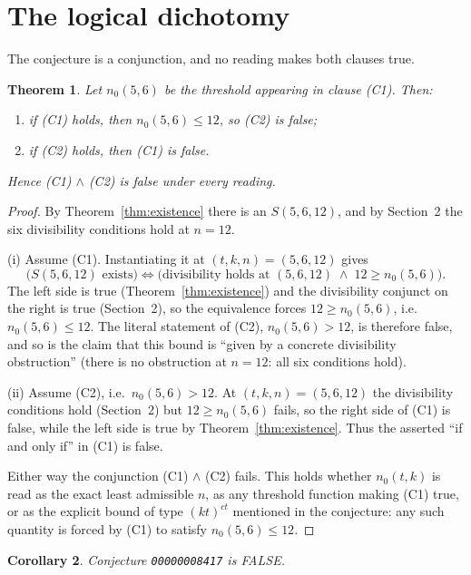 \documentclass[11pt]{article}
\newtheorem{theorem}{Theorem}
\newtheorem{corollary}[theorem]{Corollary}
\theoremstyle{definition}
\theoremstyle{remark}
\begin{document}
\section{The logical dichotomy}

The conjecture is a conjunction, and no reading makes both clauses true.

\begin{theorem}\label{thm:dichotomy}
Let $n_0(5,6)$ be the threshold appearing in clause (C1). Then:
\begin{enumerate}
\item[(i)] if (C1) holds, then $n_0(5,6) \le 12$, so (C2) is false;
\item[(ii)] if (C2) holds, then (C1) is false.
\end{enumerate}
Hence (C1) $\wedge$ (C2) is false under every reading.
\end{theorem}

\begin{proof}
By Theorem~\ref{thm:existence} there is an $S(5,6,12)$, and by
Section~2 the six divisibility conditions hold at $n=12$.

(i) Assume (C1). Instantiating it at $(t,k,n) = (5,6,12)$ gives
\[
  \bigl(\text{$S(5,6,12)$ exists}\bigr)
  \iff
  \bigl(\text{divisibility holds at } (5,6,12) \;\wedge\; 12 \ge n_0(5,6)\bigr).
\]
The left side is true (Theorem~\ref{thm:existence}) and the divisibility
conjunct on the right is true (Section~2), so the equivalence forces
$12 \ge n_0(5,6)$, i.e.\ $n_0(5,6) \le 12$. The literal statement of (C2),
$n_0(5,6) > 12$, is therefore false, and so is the claim that this bound is
``given by a concrete divisibility obstruction'' (there is no obstruction at
$n = 12$: all six conditions hold).

(ii) Assume (C2), i.e.\ $n_0(5,6) > 12$. At $(t,k,n) = (5,6,12)$ the
divisibility conditions hold (Section~2) but $12 \ge n_0(5,6)$ fails, so the
right side of (C1) is false, while the left side is true by
Theorem~\ref{thm:existence}. Thus the asserted ``if and only if'' in (C1) is
false.

Either way the conjunction (C1) $\wedge$ (C2) fails. This holds whether
$n_0(t,k)$ is read as the exact least admissible $n$, as any threshold function
making (C1) true, or as the explicit bound of type $(kt)^{ct}$ mentioned in the
conjecture: any such quantity is forced by (C1) to satisfy
$n_0(5,6) \le 12$.
\end{proof}

\begin{corollary}
Conjecture \texttt{00000008417} is FALSE.
\end{corollary}
\end{document}
